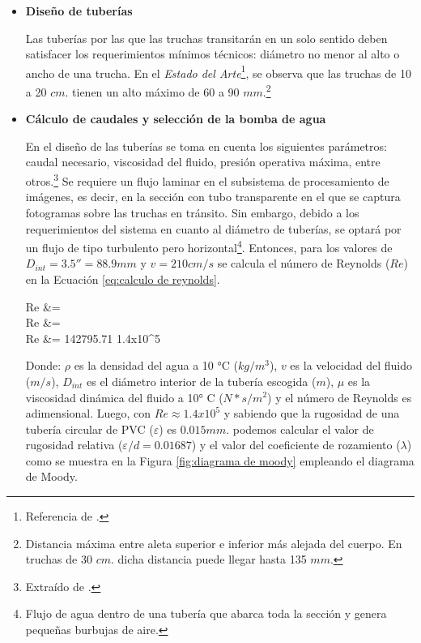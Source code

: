 \begin{itemize}
	
	\item \textbf{Diseño de tuberías}
	
	Las tuberías por las que las truchas transitarán en un solo sentido deben satisfacer los requerimientos mínimos técnicos: diámetro no menor al alto o ancho de una trucha. En el \textit{Estado del Arte}\footnote{Referencia de \cite{DiazVergara2020}.}, se observa que las truchas de 10 a 20 $cm.$ tienen un alto máximo de 60 a 90 $mm.$\footnote{Distancia máxima entre aleta superior e inferior más alejada del cuerpo. En truchas de 30 $cm.$ dicha distancia puede llegar hasta 135 $mm.$} 
	
	\item \textbf{Cálculo de caudales y selección de la bomba de agua} 
	
	En el diseño de las tuberías se toma en cuenta los siguientes parámetros: caudal necesario, viscosidad del fluido, presión operativa máxima, entre otros.\footnote{Extraído de \cite{INTECHGmbH2020}.} Se requiere un flujo laminar en el subsistema de procesamiento de imágenes, es decir, en la sección con tubo transparente en el que se captura fotogramas sobre las truchas en tránsito. Sin embargo, debido a los requerimientos del sistema en cuanto al diámetro de tuberías, se optará por un flujo de tipo turbulento pero horizontal\footnote{Flujo de agua dentro de una tubería que abarca toda la sección y genera pequeñas burbujas de aire.}. Entonces, para los valores de $D_{int}=3.5''=88.9 mm$ y $v=210 cm/s$ se calcula el número de Reynolds ($Re$) en la Ecuación \ref{eq:calculo de reynolds}.
	
	\begin{myequation}\label{eq:calculo de reynolds}
		\begin{split}
			Re &=  \\
			Re &=  \\
			Re &= 142795.71 \approx 1.4x10^5
		\end{split}		
	\end{myequation}

	Donde: $\rho$ es la densidad del agua a 10 °C ($kg/m^3$), $v$ es la velocidad del fluido ($m/s$), $D_{int}$ es el diámetro interior de la tubería escogida ($m$), $\mu$ es la viscosidad dinámica del fluido a 10° C ($N*s/m^2$) y el número de Reynolds es adimensional. Luego, con $Re\approx1.4x10^5$ y sabiendo que la rugosidad de una tubería circular de PVC ($\varepsilon$) es $0.015 mm.$ podemos calcular el valor de rugosidad relativa ($\varepsilon/d=0.01687$) y el valor del coeficiente de rozamiento ($\lambda$) como se muestra en la Figura \ref{fig:diagrama de moody} empleando el diagrama de Moody.
	

\end{itemize}
